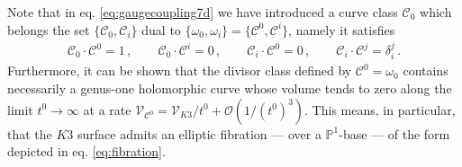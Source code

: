 Note that in eq. \eqref{eq:gaugecoupling7d} we have introduced a curve class $\mathcal{C}_0$ which belongs the set $\lbrace \mathcal{C}_0, \mathcal{C}_i \rbrace$ dual to $\lbrace \omega_0, \omega_i \rbrace = \lbrace \mathcal{C}^0, \mathcal{C}^i \rbrace$, namely it satisfies
%
\begin{align}
			\mathcal{C}_0 \cdot \mathcal{C}^0 = 1\, , \qquad \mathcal{C}_0 \cdot \mathcal{C}^i = 0\, , \qquad \mathcal{C}_i \cdot \mathcal{C}^0 = 0\, , \qquad \mathcal{C}_i \cdot \mathcal{C}^j = \delta_i^j\, .    
\end{align}
%
Furthermore, it can be shown that the divisor class defined by $\mathcal{C}^0=\omega_0$ contains necessarily a genus-one holomorphic curve whose volume tends to zero along the limit $t^0 \to \infty$ at a rate $\mathcal{V}_{\mathcal{C}^0} = \mathcal{V}_{K3}/t^0 + \mathcal{O} (1/(t^0)^3)$. This means, in particular, that the $K3$ surface admits an elliptic fibration --- over a $\mathbb{P}^1$-base --- of the form depicted in eq. \eqref{eq:fibration}.
		
